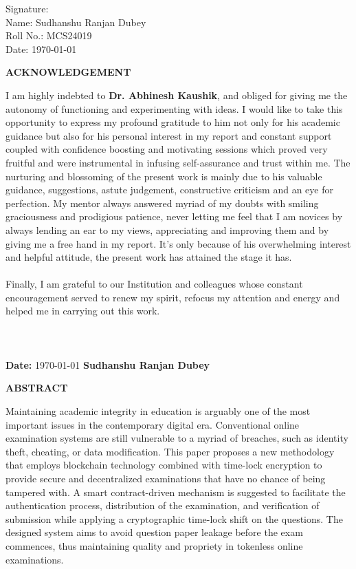 \documentclass[12pt,a4paper]{article}
\begin{document}
\noindent Signature:\vspace{1cm}\\
Name: Sudhanshu Ranjan Dubey\\
Roll No.: MCS24019\\
Date: \today\\
\clearpage
\begin{center}
{\large \bf ACKNOWLEDGEMENT}
\end{center}
I am highly indebted to {\bf Dr. Abhinesh Kaushik}, and obliged for giving me the autonomy of functioning and experimenting with ideas. I would like to take this opportunity to express my profound gratitude to him
not only for his academic guidance but also for his personal interest in my report and constant support coupled with confidence boosting and motivating sessions which proved very fruitful and were instrumental in infusing self-assurance and trust within me. The nurturing and blossoming of the present work is mainly due to his valuable guidance,
suggestions, astute judgement, constructive criticism and an eye for perfection. My mentor always answered myriad of my doubts with smiling graciousness and prodigious patience, never letting me feel that I am novices by always lending an ear to my views, appreciating and improving them and by giving me a free hand in my report. It's only because of his overwhelming interest and helpful attitude, the present work has attained the stage it has. \\
\\
Finally, I am grateful to our Institution and colleagues whose constant encouragement served to renew my spirit, refocus my attention and energy and helped me in carrying out this work.\\ \\ \\ \\
\vspace{0.7in}
\textbf{Date:}
\today
\hspace{2.3in}
\textbf{Sudhanshu Ranjan Dubey}
\clearpage
\begin{center}
{\large \bf ABSTRACT}
\end{center}
Maintaining academic integrity in education is arguably one of the most important issues in the contemporary digital era. Conventional online examination systems are still vulnerable to a myriad of breaches, such as identity theft, cheating, or data modification. This paper proposes a new methodology that employs blockchain technology combined with time-lock encryption to provide secure and decentralized examinations that have no chance of being tampered with. A smart contract-driven mechanism is suggested to facilitate the authentication process, distribution of the examination, and verification of submission while applying a cryptographic time-lock shift on the questions. The designed system aims to avoid question paper leakage before the exam commences, thus maintaining quality and propriety in tokenless online examinations.
\end{document}
